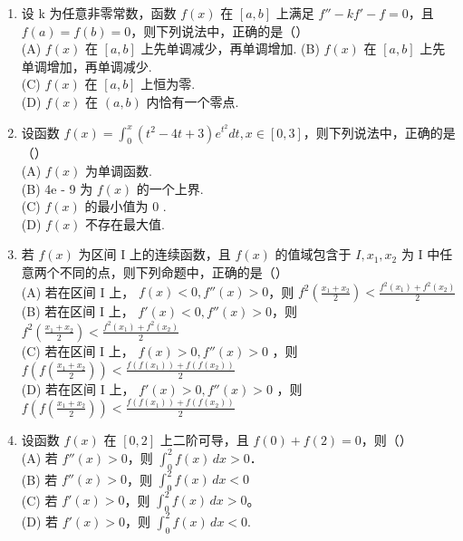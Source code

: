 \documentclass[12pt, a4paper]{ctexart}
\begin{document}
\begin{enumerate}
    \item 设 k 为任意非零常数，函数 $ f(x) $ 在 $ [a,b] $ 上满足 $ f'' - kf' - f = 0 $，且 $ f(a) = f(b) = 0 $，则下列说法中，正确的是（）\\
    (A) $ f(x) $ 在 $ [a,b] $ 上先单调减少，再单调增加. (B) $ f(x) $ 在 $ [a,b] $ 上先单调增加，再单调减少.\\
    (C) $ f(x) $ 在 $ [a,b] $ 上恒为零.\\
    (D) $ f(x) $ 在 $ (a,b) $ 内恰有一个零点.

    \item 设函数 $ f(x)=\int_{0}^{x}(t^{2}-4t+3)e^{t^{2}}dt,x\in[0,3] $，则下列说法中，正确的是（）\\
    (A) $ f(x) $ 为单调函数.\\
    (B) 4e - 9 为 $ f(x) $ 的一个上界.\\
    (C) $ f(x) $ 的最小值为 0 .\\
    (D) $ f(x) $ 不存在最大值.

    \item 若 $ f(x) $ 为区间 I 上的连续函数，且 $ f(x) $ 的值域包含于 $ I, x_1, x_2 $ 为 I 中任意两个不同的点，则下列命题中，正确的是（）\\
    (A) 若在区间 I 上， $ f(x)<0,f''(x)>0 $，则 $ f^{2}\left(\frac{x_{1}+x_{2}}{2}\right)<\frac{f^{2}\left(x_{1}\right)+f^{2}\left(x_{2}\right)}{2} $\\
    (B) 若在区间 I 上， $ f'(x)<0,f''(x)>0 $，则 $ f^{2}\left(\frac{x_{1}+x_{2}}{2}\right)<\frac{f^{2}\left(x_{1}\right)+f^{2}\left(x_{2}\right)}{2} $\\
    (C) 若在区间 I 上， $ f(x)>0,f''(x)>0 $ ，则 $ f\left(f\left(\frac{x_{1}+x_{2}}{2}\right)\right)<\frac{f\left(f\left(x_{1}\right)\right)+f\left(f\left(x_{2}\right)\right)}{2} $\\
    (D) 若在区间 I 上， $ f'(x)>0,f''(x)>0 $ ，则 $ f\left(f\left(\frac{x_{1}+x_{2}}{2}\right)\right)<\frac{f\left(f\left(x_{1}\right)\right)+f\left(f\left(x_{2}\right)\right)}{2} $

    \item 设函数 $ f(x) $ 在 $ [0,2] $ 上二阶可导，且 $ f(0) + f(2) = 0 $，则（）\\
    (A) 若 $ f''(x) > 0 $，则 $ \int_{0}^{2} f(x) \, dx > 0 $．\\
    (B) 若 $ f''(x) > 0 $，则 $ \int_{0}^{2} f(x) \, dx < 0 $\\
    (C) 若 $ f'(x) > 0 $，则 $ \int_{0}^{2} f(x) \, dx > 0 $。\\
    (D) 若 $ f'(x) > 0 $，则 $ \int_0^2 f(x) \, dx < 0 $.


\end{enumerate}
\end{document}
